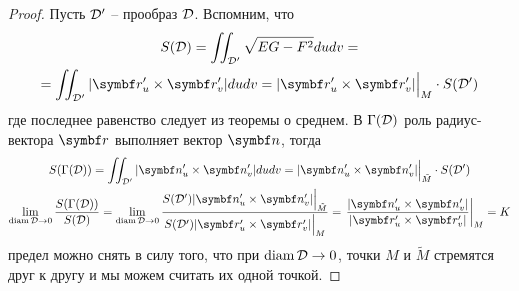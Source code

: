 \documentclass[main]{subfiles}
\begin{document}
\begin{proof}
    Пусть $\mathcal{D}'$ -- прообраз $\mathcal{D}$.
    Вспомним, что
    \begin{multline*}
        S(\fancyD) = \iint_{\fancyD'} \sqrt{EG-F^2} dudv = \\
        = \iint_{\fancyD'}|\vr'_u \times \vr'_v| dudv = |\vr'_u \times \vr'_v|\Big|_{M} \cdot S(\fancyD')
    \end{multline*}
    где последнее равенство следует из теоремы о среднем.
    В $\Gamma(\mathcal{D})$ роль радиус-вектора $\vr$ выполняет вектор $\vn$, тогда
    \begin{gather*}
        S(\Gamma(\fancyD)) = \iint_{\fancyD'} |\vn'_u \times \vn'_v|dudv =  |\vn'_u \times \vn'_v|\Big|_{\tilde{M}} \cdot S(\fancyD')\\
        \lim_{\diam \fancyD \to 0} \frac{S(\Gamma(\fancyD))}{S(\fancyD)} =
        \lim_{\diam \fancyD \to 0}  \frac{S(\fancyD')|\vn'_u \times \vn'_v| \Big|_{\tilde{M}}}{S(\fancyD')|\vr'_u \times \vr'_v|\Big|_{M} } =
        \left.\frac{|\vn'_u \times \vn'_v|}{|\vr'_u \times \vr'_v|}\right|_M = K
    \end{gather*}
    предел можно снять в силу того, что при $\operatorname{diam} \mathcal{D} \to 0$, точки $M$ и $\tilde{M}$ стремятся друг к другу и мы можем считать их одной точкой.
\end{proof}
\end{document}

